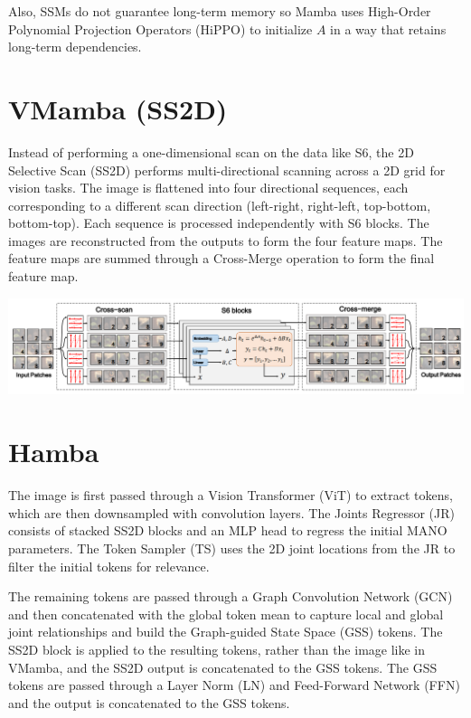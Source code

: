 \documentclass{article}
\begin{document}
Also, SSMs do not guarantee long-term memory so Mamba uses High-Order Polynomial Projection Operators (HiPPO) to initialize $A$ in a way that retains long-term dependencies.

\section*{VMamba (SS2D)}

Instead of performing a one-dimensional scan on the data like S6, the 2D Selective Scan (SS2D) performs multi-directional scanning across a 2D grid for vision tasks. The image is flattened into four directional sequences, each corresponding to a different scan direction (left-right, right-left, top-bottom, bottom-top). Each sequence is processed independently with S6 blocks. The images are reconstructed from the outputs to form the four feature maps. The feature maps are summed through a Cross-Merge operation to form the final feature map.

\begin{center}
    \includegraphics[scale=0.3]{vmamba-1.png}
\end{center}

\section*{Hamba}

The image is first passed through a Vision Transformer (ViT) to extract tokens, which are then downsampled with convolution layers. The Joints Regressor (JR) consists of stacked SS2D blocks and an MLP head to regress the initial MANO parameters. The Token Sampler (TS) uses the 2D joint locations from the JR to filter the initial tokens for relevance.
\vspace{1em}

The remaining tokens are passed through a Graph Convolution Network (GCN) and then concatenated with the global token mean to capture local and global joint relationships and build the Graph-guided State Space (GSS) tokens. The SS2D block is applied to the resulting tokens, rather than the image like in VMamba, and the SS2D output is concatenated to the GSS tokens. The GSS tokens are passed through a Layer Norm (LN) and Feed-Forward Network (FFN) and the output is concatenated to the GSS tokens.
\end{document}
